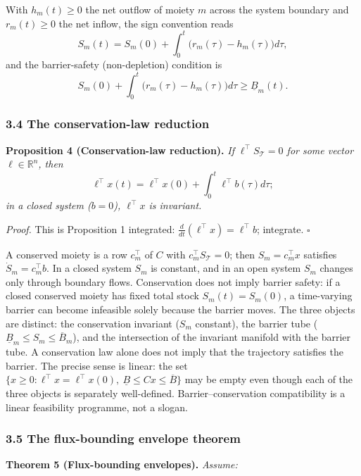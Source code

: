 \documentclass[11pt]{article}
\begin{document}
With \(h_m(t) \ge 0\) the net outflow of moiety \(m\) across the system
boundary and \(r_m(t) \ge 0\) the net inflow, the sign convention reads
\[S_m(t) = S_m(0) + \int_0^t \bigl( r_m(\tau) - h_m(\tau) \bigr) d\tau,\]
and the barrier-safety (non-depletion) condition is
\[S_m(0) + \int_0^t \bigl( r_m(\tau) - h_m(\tau) \bigr) d\tau \ge \underline{B}_m(t).\]

\subsubsection{3.4 The conservation-law
reduction}\label{the-conservation-law-reduction}

\textbf{Proposition 4 (Conservation-law reduction).} \emph{If
\(\ell^\top S_{\mathcal{T}} = 0\) for some vector
\(\ell \in \mathbb{R}^n\), then}
\[\ell^\top x(t) = \ell^\top x(0) + \int_0^t \ell^\top b(\tau) d\tau;\]
\emph{in a closed system (\(b = 0\)), \(\ell^\top x\) is invariant.}

\emph{Proof.} This is Proposition 1 integrated:
\(\frac{d}{dt}(\ell^\top x) = \ell^\top b\); integrate. \ensuremath{\square}

A conserved moiety is a row \(c_m^\top\) of \(C\) with
\(c_m^\top S_{\mathcal{T}} = 0\); then \(S_m = c_m^\top x\) satisfies
\(\dot S_m = c_m^\top b\). In a closed system \(S_m\) is constant, and
in an open system \(S_m\) changes only through boundary flows.
Conservation does not imply barrier safety: if a closed conserved moiety
has fixed total stock \(S_m(t) = S_m(0)\), a time-varying barrier can
become infeasible solely because the barrier moves. The three objects
are distinct: the conservation invariant (\(S_m\) constant), the barrier
tube (\(\underline{B}_m \le S_m \le \overline{B}_m\)), and the
intersection of the invariant manifold with the barrier tube. A
conservation law alone does not imply that the trajectory satisfies the
barrier. The precise sense is linear: the set
\(\{x \ge 0 : \ell^\top x = \ell^\top x(0),\ \underline{B} \le Cx \le \overline{B}\}\)
may be empty even though each of the three objects is separately
well-defined. Barrier--conservation compatibility is a linear
feasibility programme, not a slogan.

\subsubsection{3.5 The flux-bounding envelope
theorem}\label{the-flux-bounding-envelope-theorem}

\textbf{Theorem 5 (Flux-bounding envelopes).} \emph{Assume:}
\end{document}
